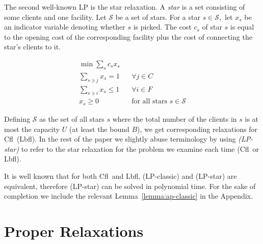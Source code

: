 \documentclass[11pt]{article}\usepackage{amsmath}
\newcommand{\lbfl}{{\sc Lbfl}}
\newcommand{\cfl}{{\sc Cfl}}
\begin{document}
The second well-known LP  is the star relaxation.
A {\em star} is a set consisting of some  clients and
one facility. Let $\mathcal{S}$ be a set of stars. For a star  $s\in \mathcal{S},$ let  $x_s$ be an indicator variable denoting
whether  $s$ is picked.   The cost  $c_s$ of star $s$   is equal
to the opening cost of the corresponding facility plus the cost of
connecting the star's clients to it. 

\begin{align}
\min \sum_{s} c_sx_{s}   &&   \tag{LP-star} \\
\sum_{s \ni  j } x_s = 1   && \forall j \in C  \label{star:client} \\
\sum_{s \ni  i } x_s \leq  1   && \forall i \in F \label{star:facility} \\ 
x_s \geq 0       &&  \text{for all stars } s \in \mathcal{S} \label{star:nn} 
\end{align} 

\iffalse \[ \begin{array}{ccccc}
& \min \sum_{s\in \mathcal{S}} c_sx_{s}   &  \\
\sum_{s \ni  j } x_s = 1   \;\; \forall j \in C  & &
\sum_{s \ni  i } x_s \leq  1  \;\;  \forall i \in F  &  & 
x_s \geq 0         \;\;  \text{for all stars } s \in \mathcal{S}  
\end{array}  \]   
\[ \min \{ \sum_{s} c_sx_{s} \mid \sum_{s \ni  j } x_s = 1   \;\;
\forall j \in C, \;\;\;  \sum_{s \ni  i } x_s \leq  1  \;\;  \forall i \in F,
\;\;\; x_s \geq 0         \;\;  \text{for all stars } s \in \mathcal{S}   \} \]
 \fi

Defining $\mathcal{S}$ as the set of all stars $s$ where  the total number of the clients in $s$ 
is at most the
capacity $U$ (at least the bound $B$),  we get corresponding relaxations for
  \cfl\ (\lbfl).
In the rest of the paper we  slightly abuse terminology by 
using    {\em (LP-star)}  to refer to the
star relaxation for the problem we examine each time (\cfl\  or \lbfl).

It is well known  that for both \cfl\ and \lbfl, (LP-classic) and (LP-star) are
equivalent, therefore (LP-star) can be solved in  polynomial time.
 For
the sake of completion we include the relevant 
Lemma~\ref{lemma:ap-classic} in the Appendix. 








\section{Proper Relaxations}     \label{sec:firstfamily}
\end{document}
